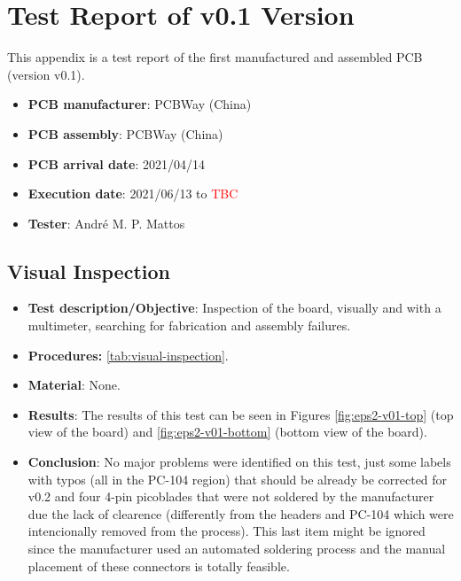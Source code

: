 %
%
%
%
%

%
%
%
%
%
%

\chapter{Test Report of v0.1 Version} \label{anx:test-report-v01}

This appendix is a test report of the first manufactured and assembled PCB (version v0.1).

\begin{itemize}
    \item \textbf{PCB manufacturer}: PCBWay (China)
    \item \textbf{PCB assembly}: PCBWay (China)
    \item \textbf{PCB arrival date}: 2021/04/14
    \item \textbf{Execution date}: 2021/06/13 to \textcolor{red}{TBC}
    \item \textbf{Tester}: André M. P. Mattos
\end{itemize}



\section{Visual Inspection}

\begin{itemize}
    \item \textbf{Test description/Objective}: Inspection of the board, visually and with a multimeter, searching for fabrication and assembly failures.
    \item \textbf{Procedures:} \autoref{tab:visual-inspection}.
    \item \textbf{Material}: None.
    \item \textbf{Results}: The results of this test can be seen in Figures \ref{fig:eps2-v01-top} (top view of the board) and \ref{fig:eps2-v01-bottom} (bottom view of the board).
    \item \textbf{Conclusion}: No major problems were identified on this test, just some labels with typos (all in the PC-104 region) that should be already be corrected for v0.2 and four 4-pin picoblades that were not soldered by the manufacturer due the lack of clearence (differently from the headers and PC-104 which were intencionally removed from the process). This last item might be ignored since the manufacturer used an automated soldering process and the manual placement of these connectors is totally feasible.  
\end{itemize}

